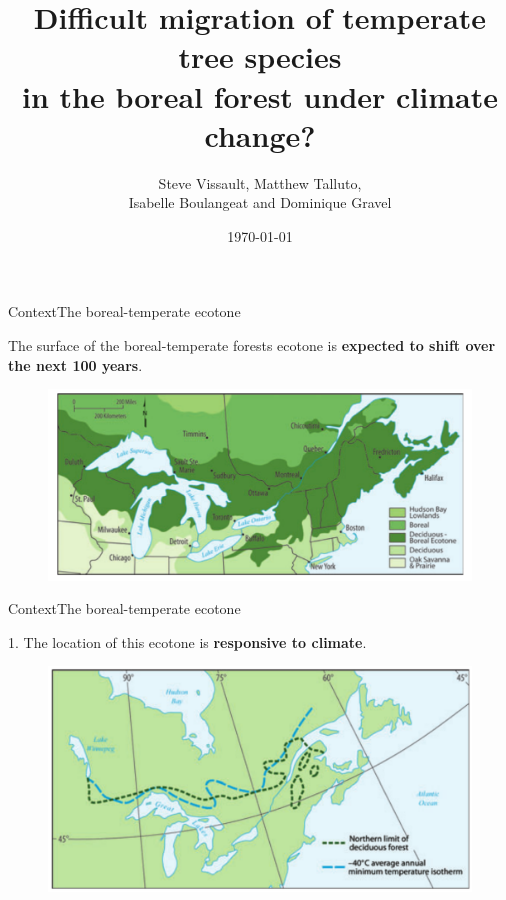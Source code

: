 \documentclass[10pt,aspectratio=149]{beamer}
\author{Steve Vissault, Matthew Talluto, \\
Isabelle Boulangeat and Dominique Gravel}
\title{Difficult migration of temperate tree species \\
in the boreal forest under climate change?}
\date{\today}
\institute{Université du Québec à Rimouski}
\begin{document}
\begin{frame}[plain]
   \titlepage  
\end{frame}

	

\begin{frame}{Context}{The boreal-temperate ecotone}

The surface of the boreal-temperate forests ecotone is \textbf{expected to shift over the next 100 years}.

\begin{figure}
	\includegraphics[width=.70\paperwidth]{Figs/ecotone.pdf}
\end{figure}

\end{frame}




\begin{frame}{Context}{The boreal-temperate ecotone}

1. The location of this ecotone is \textbf{responsive to climate}.

\begin{figure}
	\includegraphics[width=.70\paperwidth]{Figs/climecotone.png}
\end{figure}

\end{frame}
\end{document}
